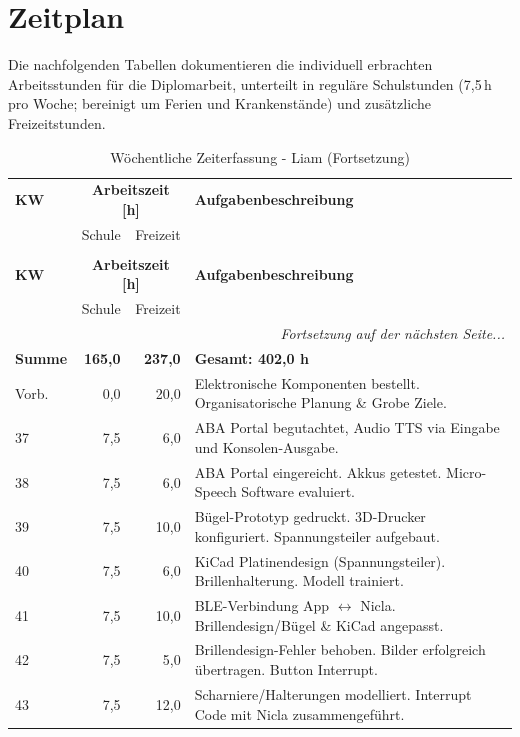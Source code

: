 \section{Zeitplan}
Die nachfolgenden Tabellen dokumentieren die individuell erbrachten Arbeitsstunden für die Diplomarbeit, unterteilt in reguläre Schulstunden (7,5\,h pro Woche; bereinigt um Ferien und Krankenstände) und zusätzliche Freizeitstunden.

\renewcommand{\arraystretch}{1.1}
\begin{longtable}{l r r p{\dimexpr\textwidth-4.5cm\relax}}
\caption{Wöchentliche Zeiterfassung - Liam}
\label{tab:zeiterfassung_liam} \\
\hline
\textbf{KW} & \multicolumn{2}{c}{\textbf{Arbeitszeit [h]}} & \textbf{Aufgabenbeschreibung} \\
& Schule & Freizeit & \\
\hline
\endfirsthead
\caption[]{Wöchentliche Zeiterfassung - Liam (Fortsetzung)} \\
\hline
\textbf{KW} & \multicolumn{2}{c}{\textbf{Arbeitszeit [h]}} & \textbf{Aufgabenbeschreibung} \\
& Schule & Freizeit & \\
\hline
\endhead
\hline
\multicolumn{4}{r}{\textit{Fortsetzung auf der nächsten Seite...}} \\
\endfoot
\hline
\textbf{Summe} & \textbf{165,0} & \textbf{237,0} & \textbf{Gesamt: 402,0 h} \\
\hline
\hline
\endlastfoot
Vorb. & 0,0 & 20,0 & Elektronische Komponenten bestellt. Organisatorische Planung \& Grobe Ziele. \\
37 & 7,5 & 6,0 & ABA Portal begutachtet, Audio TTS via Eingabe und Konsolen-Ausgabe. \\
38 & 7,5 & 6,0 & ABA Portal eingereicht. Akkus getestet. Micro-Speech Software evaluiert. \\
39 & 7,5 & 10,0 & Bügel-Prototyp gedruckt. 3D-Drucker konfiguriert. Spannungsteiler aufgebaut. \\
40 & 7,5 & 6,0 & KiCad Platinendesign (Spannungsteiler). Brillenhalterung. Modell trainiert. \\
41 & 7,5 & 10,0 & BLE-Verbindung App $\leftrightarrow$ Nicla. Brillendesign/Bügel \& KiCad angepasst. \\
42 & 7,5 & 5,0 & Brillendesign-Fehler behoben. Bilder erfolgreich übertragen. Button Interrupt. \\
43 & 7,5 & 12,0 & Scharniere/Halterungen modelliert. Interrupt Code mit Nicla zusammengeführt. \\

\end{longtable}
